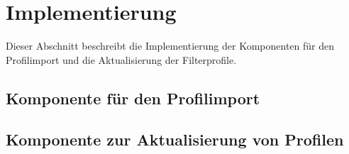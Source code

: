 {{}

\section{Implementierung}{
Dieser Abschnitt beschreibt die Implementierung der Komponenten für den Profilimport und die Aktualisierung der Filterprofile.

\subsection{Komponente für den Profilimport}{






}

\subsection{Komponente zur Aktualisierung von Profilen}{



}







}

}

